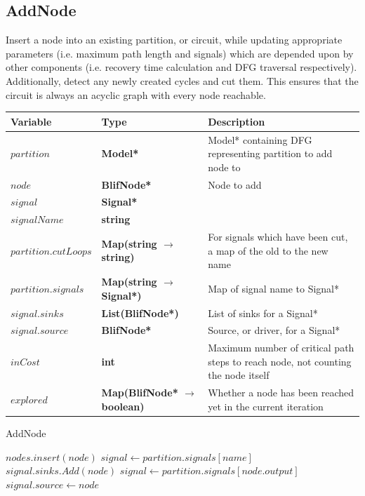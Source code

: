 \documentclass[12pt,final,oneside]{dwThesis} %
\begin{document}
   \newpage
   \subsection{AddNode}
   Insert a node into an existing partition, or circuit, while updating appropriate parameters (i.e. maximum path length and signals) which are depended upon by other components (i.e. recovery time calculation and \ac{DFG} traversal respectively).
   Additionally, detect any newly created cycles and cut them.
   This ensures that the circuit is always an acyclic graph with every node reachable.
   \begin{algorithm}
      \begin{center}
         \begin{tabularx}{\linewidth}{llX}
            \toprule
            Variable & Type & Description\\
            \midrule
            $partition$ &\textbf{  Model* } &  Model* containing DFG representing partition to add node to\\
            $node$ &\textbf{  BlifNode* } &  Node to add\\
            $signal$ &\textbf{  Signal* } &  \\
            $signalName$ &\textbf{  string } &  \\
            $partition.cutLoops$ &\textbf{  Map(string $\to$ string) } &  For signals which have been cut, a map of the old to the new name\\
            $partition.signals$ &\textbf{  Map(string $\to$ Signal*) } &  Map of signal name to Signal* \\
            $signal.sinks$ &\textbf{  List(BlifNode*) } &  List of sinks for a Signal* \\
            $signal.source$ &\textbf{  BlifNode* } &  Source, or driver, for a Signal* \\
            $inCost$ &\textbf{  int } &  Maximum number of critical path steps to reach node, not counting the node itself \\
            $explored$ &\textbf{  Map(BlifNode* $\to$ boolean) } &  Whether a node has been reached yet in the current iteration \\ 
            \bottomrule
         \end{tabularx}
      \end{center}
      \caption{AddNode}\label{addnode}
      \begin{algorithmic}[1]
         \State $nodes.insert(node)$
         \State $signal \gets partition.signals[name]$
         \State $signal.sinks.Add(node)$
         \EndFor
         \State $signal \gets partition.signals[node.output]$
         \State $signal.source \gets node$


\end{algorithmic}
\end{algorithm}
\end{document}
